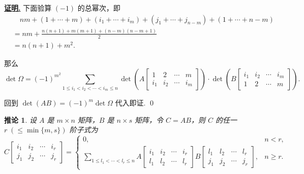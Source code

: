 \documentclass[10pt,openany]{article}
\theoremstyle{thmstyle} %
\theoremstyle{defstyle} %
\newtheorem{corollary}[theorem]{推论}
\theoremstyle{prostyle} %
\theoremstyle{exastyle}
\theoremstyle{remstyle}
\renewenvironment{proof}[1][证明]{\par\underline{\textbf{#1.}} \;\fangsong}{\qed\par}
\begin{document}
\begin{proof}
	下面验算 \( (-1) \) 的总幂次，即
	\begin{align*}
		&\quad nm+(1+\cdots+m)+(i_1+\cdots+i_m)+(j_1+\cdots+j_{n-m})+(1+\cdots+n-m) \\
		&=nm+\frac{n(n+1)+m(m+1)+(n-m)(n-m+1)}{2} \\
		&=n(n+1)+m^2.
	\end{align*}
    
    那么
    \[ \det \Omega= (-1)^{m^2} \sum_{1 \leq i_1 < i_2 < \cdots < i_m \leq n}
    \det\left(
    A\begin{bmatrix}
    	1 & 2 & \cdots & m \\
    	i_1 & i_2 & \cdots & i_m
    \end{bmatrix}
    \right)
    \cdot
    \det\left(
    B\begin{bmatrix}
    	i_1 & i_2 & \cdots & i_m \\
    	1 & 2 & \cdots & m
    \end{bmatrix}
    \right). \]
    
    回到 \( \det (AB)=(-1)^m \det \Omega \) 代入即证.
\end{proof}

\begin{corollary} \label{2.4.6}
   设 \( A \) 是 \( m \times n \) 矩阵，\( B \) 是 \( n \times s \) 矩阵，令 \( C = AB \)，则 \( C \) 的任一 \( r \; (\leq \min\{m,s\})\) 阶子式为
	\[
	C\begin{bmatrix}
		i_1 & i_2 & \cdots & i_r \\
		j_1 & j_2 & \cdots & j_r
	\end{bmatrix}
	=
	\left\{
	\begin{array}{lr}
		0, & n < r, \\
		\displaystyle \sum_{1 \le l_1 < \cdots < l_r \le n}
		A\begin{bmatrix}
			i_1 & i_2 & \cdots & i_r \\
			l_1 & l_2 & \cdots & l_r
		\end{bmatrix}
		B\begin{bmatrix}
			l_1 & l_2 & \cdots & l_r \\
			j_1 & j_2 & \cdots & j_r
		\end{bmatrix}, & n \ge r.
	\end{array}
	\right.
	\]
\end{corollary}
\end{document}
